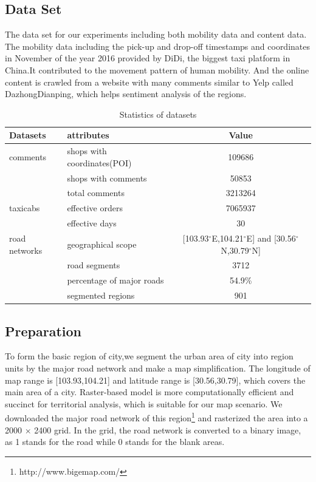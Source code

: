 \documentclass[runningheads]{llncs}
\begin{document}
\subsection{Data Set}
The data set for our experiments including both mobility data and content data.
The mobility data including the pick-up and drop-off timestamps and coordinates in November of the year 2016 provided by DiDi, the biggest taxi platform in China.It contributed to the movement pattern of human mobility.
And the online content is crawled from a website with many comments similar to Yelp called DazhongDianping, which helps sentiment analysis of the regions.
\begin{table}[h]
\caption{Statistics of datasets}\label{dataset}
\begin{tabular}{|l|l|c|}
\hline
Datasets &  attributes & Value\\
\hline
comments & shops with coordinates(POI) & 109686\\
 & shops with comments & 50853\\
 & total comments & 3213264\\
\hline
taxicabs & effective orders & 7065937\\
 & effective days & 30 \\
\hline
road networks & geographical scope & [103.93$^\circ$E,104.21$^\circ$E] and [30.56$^\circ$N,30.79$^\circ$N]\\
 & road segments & 3712\\
 & percentage of major roads & 54.9\%\\
 & segmented regions & 901\\
\hline
\end{tabular}
\end{table}

\subsection{Preparation}
To form the basic region of city,we segment the urban area of city into region units by the major road network and make a map simplification.
The longitude of map range is [103.93,104.21] and latitude range is [30.56,30.79], which covers the main area of a city.
Raster-based model is more computationally efficient and succinct for territorial analysis, which is suitable for our map scenario.
We downloaded the major road network of this region\footnote{http://www.bigemap.com/} and rasterized the area into a 2000 $\times$ 2400 grid.
In the grid, the road network is converted to a binary image, as 1 stands for the road while 0 stands for the blank areas.
\end{document}
